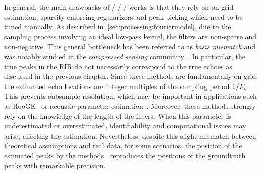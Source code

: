 \mynewline
In general, the main drawbacks of \FIR/ \SIMO/ \BCE/ works is that they rely on on-grid estimation, sparsity-enforcing regularizers and peak-picking which need to be tuned manually.
As described in~\cref{sec:processing:fouriermodel}, due to the sampling process involving an ideal low-pass kernel, the filters are non-sparse and non-negative.
This general bottleneck has been referred to as \textit{basis mismatch} and was notably studied in the \textit{compressed sensing} community~.
In particular, the true peaks in the \ac{RIR} do not necessarily correspond to the true echoes as discussed in the previous chapter.
Since these methods are fundamentally on-grid, the estimated echo locations are integer multiples of the sampling period $1/F_s$.
This prevents subsample resolution, which may be important in applications such as \ac{RooGE}~ or acoustic parameter estimation~.
Moreover, these methods strongly rely on the knowledge of the length of the filters.
When this parameter is underestimated or overestimated, identifiability and computational issues may arise, affecting the estimation.
Nevertheless, despite this slight mismatch between theoretical assumptions and real data, for some scenarios, the position of the estimated peaks by the methods~ reproduces the positions of the groundtruth peaks with remarkable precision.

